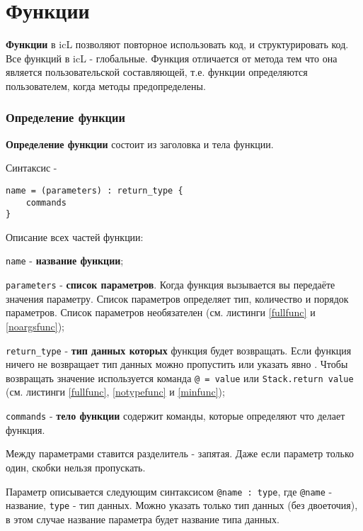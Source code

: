\section{Функции}

{\bf Функции} в icL позволяют повторное использовать код, и структурировать код. Все функций в icL - глобальные. Функция отличается от метода тем что она является пользовательской составляющей, т.е. функции определяются пользователем, когда методы предопределены.

\subsubsection{Определение функции}

{\bf Определение функции} состоит из заголовка и тела функции.

\noindent Синтаксис -
\begin{verbatim}
name = (parameters) : return_type {
	commands
}
\end{verbatim}

Описание всех частей функции:
\begin{icItems}
\item
	\texttt{name} - {\bf название функции};
\item
	\texttt{parameters} - {\bf список параметров}. Когда функция вызывается вы передаёте значения параметру. Список параметров определяет тип, количество и порядок параметров. Список параметров необязателен (см. листинги \ref{fullfunc} и \ref{noargsfunc});
\item
	\texttt{return_type} - {\bf тип данных которых} функция будет возвращать. Если функция ничего не возвращает тип данных можно пропустить или указать явно \void{}. Чтобы возвращать значение используется команда \texttt{@ = value} или \texttt{Stack.return value} (см. листинги \ref{fullfunc}, \ref{notypefunc} и \ref{minfunc});
\item
	\texttt{commands} - {\bf тело функции} содержит команды, которые определяют что делает функция.
\end{icItems}

Между параметрами ставится разделитель - запятая. Даже если параметр только один, скобки нельзя пропускать.

Параметр описывается следующим синтаксисом \texttt{@name : type}, где \texttt{@name} - название, \texttt{type} - тип данных. Можно указать только тип данных (без двоеточия), в этом случае название параметра будет название типа данных.

